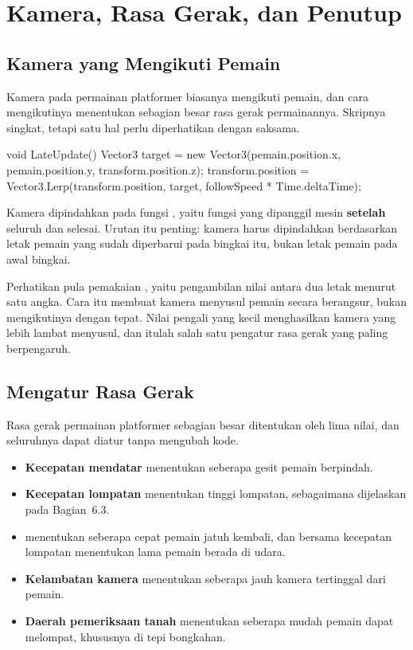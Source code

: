 \section{Kamera, Rasa Gerak, dan Penutup}
\label{sec:kamera-rasa}

\subsection{Kamera yang Mengikuti Pemain}

Kamera pada permainan platformer biasanya mengikuti pemain, dan cara
mengikutinya menentukan sebagian besar rasa gerak permainannya. Skripnya
singkat, tetapi satu hal perlu diperhatikan dengan saksama.

\begin{kodekeluaran}
void LateUpdate()
{
    Vector3 target = new Vector3(pemain.position.x, pemain.position.y,
                                 transform.position.z);
    transform.position = Vector3.Lerp(transform.position, target,
                                      followSpeed * Time.deltaTime);
}
\end{kodekeluaran}

Kamera dipindahkan pada fungsi , yaitu fungsi
yang dipanggil mesin \textbf{setelah} seluruh  dan
 selesai. Urutan itu penting: kamera harus dipindahkan
berdasarkan letak pemain yang sudah diperbarui pada bingkai itu, bukan letak
pemain pada awal bingkai.

Perhatikan pula pemakaian , yaitu pengambilan nilai antara
dua letak menurut satu angka. Cara itu membuat kamera menyusul pemain secara
berangsur, bukan mengikutinya dengan tepat. Nilai pengali yang kecil
menghasilkan kamera yang lebih lambat menyusul, dan itulah salah satu pengatur
rasa gerak yang paling berpengaruh.

\subsection{Mengatur Rasa Gerak}

Rasa gerak permainan platformer sebagian besar ditentukan oleh lima nilai, dan
seluruhnya dapat diatur tanpa mengubah kode.

\begin{itemize}
  \item \textbf{Kecepatan mendatar} menentukan seberapa gesit pemain
        berpindah.
  \item \textbf{Kecepatan lompatan} menentukan tinggi lompatan, sebagaimana
        dijelaskan pada Bagian~6.3.
  \item \textbf{} menentukan seberapa cepat pemain
        jatuh kembali, dan bersama kecepatan lompatan menentukan lama pemain
        berada di udara.
  \item \textbf{Kelambatan kamera} menentukan seberapa jauh kamera tertinggal
        dari pemain.
  \item \textbf{Daerah pemeriksaan tanah} menentukan seberapa mudah pemain
        dapat melompat, khususnya di tepi bongkahan.
\end{itemize}


